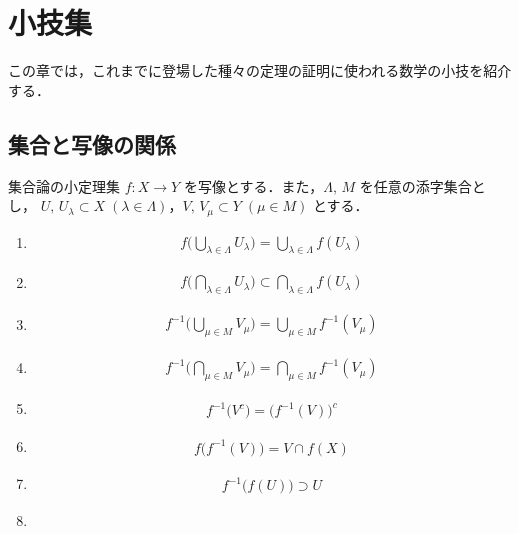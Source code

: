 \documentclass[geometry_main]{subfiles}
\begin{document}
\setcounter{chapter}{3}

\chapter{小技集}

この章では，これまでに登場した種々の定理の証明に使われる数学の小技を紹介する．

\section{集合と写像の関係}

\begin{mylem}[label=lem:sets,breakable]{集合論の小定理集}
	$f \colon X \to Y$ を写像とする．また，$\Lambda,\, M$ を任意の添字集合とし， $U,\, U_\lambda \subset X\; (\lambda \in \Lambda)$，$V,\, V_\mu \subset Y\; (\mu \in M)$ とする．
	\begin{enumerate}
		\item 
		\begin{align}
			f\Biggl(\bigcup_{\lambda \in \Lambda} U_\lambda \Biggr) = \bigcup_{\lambda \in \Lambda} f(U_\lambda)
		\end{align}
		\item 
		\begin{align}
			f\Biggl(\bigcap_{\lambda \in \Lambda} U_\lambda \Biggr) \subset \bigcap_{\lambda \in \Lambda} f(U_\lambda)
		\end{align}
		\item 
		\begin{align}
			f^{-1}\Biggl(\bigcup_{\mu \in M} V_\mu \Biggr) = \bigcup_{\mu \in M} f^{-1}(V_\mu)
		\end{align}
		\item \begin{align}
			f^{-1}\Biggl(\bigcap_{\mu \in M} V_\mu \Biggr) = \bigcap_{\mu \in M} f^{-1}(V_\mu)
		\end{align}
		\item \begin{align}
			f^{-1}\bigl(V^c \bigr) = \bigl(f^{-1}(V)\bigr)^c
		\end{align}
		\item \begin{align}
			f \bigl( f^{-1} (V)\bigr) = V \cap f(X)
		\end{align}
		\item \begin{align}
			f^{-1}\bigl( f (U)\bigr) \supset U
		\end{align}
		\item \begin{align}

\end{align}
\end{enumerate}
\end{mylem}
\end{document}
